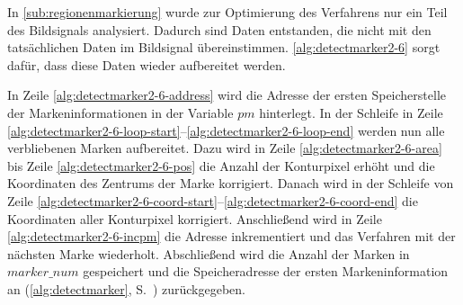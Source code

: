 

In \autoref{sub:regionenmarkierung} wurde zur Optimierung des Verfahrens nur ein Teil des Bildsignals analysiert.
 Dadurch sind Daten entstanden, die nicht mit den tatsächlichen Daten im Bildsignal übereinstimmen.
 \autoref{alg:detectmarker2-6} sorgt dafür, dass diese Daten wieder aufbereitet werden.



In Zeile \ref{alg:detectmarker2-6-address} wird die Adresse der ersten Speicherstelle der Markeninformationen in der
 Variable $\mathit{pm}$ hinterlegt. In der Schleife in Zeile
 \ref{alg:detectmarker2-6-loop-start}--\ref{alg:detectmarker2-6-loop-end} werden nun alle verbliebenen Marken
 aufbereitet. Dazu wird in Zeile \ref{alg:detectmarker2-6-area} bis Zeile \ref{alg:detectmarker2-6-pos} die Anzahl der
 Konturpixel erhöht und die Koordinaten des Zentrums der Marke korrigiert. Danach wird in der Schleife von Zeile
 \ref{alg:detectmarker2-6-coord-start}--\ref{alg:detectmarker2-6-coord-end} die Koordinaten aller Konturpixel
 korrigiert. Anschließend wird in Zeile \ref{alg:detectmarker2-6-incpm} die Adresse inkrementiert und das Verfahren mit
 der nächsten Marke wiederholt. Abschließend wird die Anzahl der Marken in $\mathit{marker\_num}$ gespeichert und die
 Speicheradresse der ersten Markeninformation an  (\autoref{alg:detectmarker},
 S.~\pageref{alg:detectmarker}) zurückgegeben.



